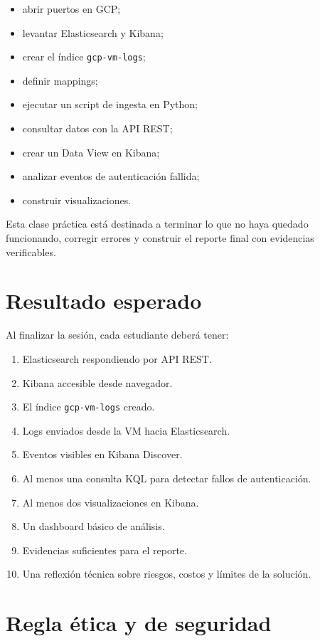 \documentclass[
  coursetitle={Cómputo Nube y Tecnologías Emergentes},
  coursehours={96},
  coursedate={Verano 2026},
  doctype={Práctica},
  otherlangs={english,french},
  authorname={Lázaro},
  authorsurname={Bustio-Martínez},
  authortitle={PhD},
  role={Profesor Investigador},
  email={lbustio@inaoe.mx},
  phone={5559504000},
  ext={7459},
  institution={Instituto Nacional de Astrofísica, Óptica y Electrónica (INAOE)},
  department={Maestría en Ciencias en Tecnologías de Seguridad},
  address={Luis Enrique Erro 1, Sta. Ma. Tonantzintla, San Andrés Cholula, CP 72840, Puebla, México},
  margin={0.5in}
]{../../lbustio_lecture_notes}
\begin{document}
\begin{itemize}
    \item abrir puertos en GCP;
    \item levantar Elasticsearch y Kibana;
    \item crear el índice \texttt{gcp-vm-logs};
    \item definir mappings;
    \item ejecutar un script de ingesta en Python;
    \item consultar datos con la API REST;
    \item crear un Data View en Kibana;
    \item analizar eventos de autenticación fallida;
    \item construir visualizaciones.
\end{itemize}

Esta clase práctica está destinada a terminar lo que no haya quedado funcionando, corregir errores y construir el reporte final con evidencias verificables.

\section{Resultado esperado}

Al finalizar la sesión, cada estudiante deberá tener:

\begin{enumerate}
    \item Elasticsearch respondiendo por API REST.
    \item Kibana accesible desde navegador.
    \item El índice \texttt{gcp-vm-logs} creado.
    \item Logs enviados desde la VM hacia Elasticsearch.
    \item Eventos visibles en Kibana Discover.
    \item Al menos una consulta KQL para detectar fallos de autenticación.
    \item Al menos dos visualizaciones en Kibana.
    \item Un dashboard básico de análisis.
    \item Evidencias suficientes para el reporte.
    \item Una reflexión técnica sobre riesgos, costos y límites de la solución.
\end{enumerate}

\section{Regla ética y de seguridad}
\end{document}
